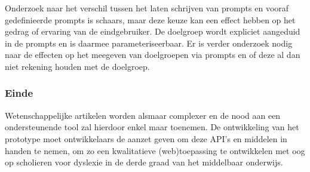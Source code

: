 \medspace

Onderzoek naar het verschil tussen het laten schrijven van prompts en vooraf gedefinieerde prompts is schaars, maar deze keuze kan een effect hebben op het gedrag of ervaring van de eindgebruiker. De doelgroep wordt expliciet aangeduid in de prompts en is daarmee parameteriseerbaar. Er is verder onderzoek nodig naar de effecten op het meegeven van doelgroepen via prompts en of deze al dan niet rekening houden met de doelgroep. 

\subsubsection{Einde}

Wetenschappelijke artikelen worden alsmaar complexer en de nood aan een ondersteunende tool zal hierdoor enkel maar toenemen. De ontwikkeling van het prototype moet ontwikkelaars de aanzet geven om deze API's en middelen in handen te nemen, om zo een kwalitatieve (web)toepassing te ontwikkelen met oog op scholieren voor dyslexie in de derde graad van het middelbaar onderwijs. 
